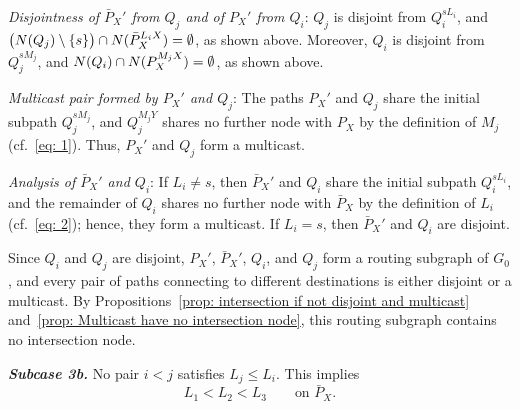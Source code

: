 \documentclass[11pt]{article}
\begin{document}
\par\vspace{0.4em}
\noindent\emph{Disjointness of \(\bar P_X'\) from \(Q_j\) and of \(P_X'\) from \(Q_i\)}:
\(Q_j\) is disjoint from \(Q_i^{sL_i}\), and \(\bigl(N(Q_j)\setminus\{s\}\bigr)\cap N(\bar P_X^{L_iX})=\nobreak\emptyset\), as shown above. Moreover, \(Q_i\) is disjoint from \(Q_j^{sM_j}\), and \(N(Q_i)\cap N(P_X^{M_jX})=\nobreak\emptyset\), as shown above.

\par\vspace{0.4em}
\noindent\emph{Multicast pair formed by \(P_X'\) and \(Q_j\)}:
The paths \(P_X'\) and \(Q_j\) share the initial subpath \(Q_j^{sM_j}\), and \(Q_j^{M_jY}\) shares no further node with \(P_X\) by the definition of \(M_j\) (cf.~\eqref{eq: 1}). Thus, \(P_X'\) and \(Q_j\) form a multicast.

\par\vspace{0.4em}
\noindent\emph{Analysis of \(\bar P_X'\) and \(Q_i\)}:
If \(L_i\neq s\), then \(\bar P_X'\) and \(Q_i\) share the initial subpath \(Q_i^{sL_i}\), and the remainder of \(Q_i\) shares no further node with \(\bar P_X\) by the definition of \(L_i\) (cf.~\eqref{eq: 2}); hence, they form a multicast. If \(L_i=s\), then \(\bar P_X'\) and \(Q_i\) are disjoint.
\par\vspace{0.6em}
\noindent Since \(Q_i\) and \(Q_j\) are disjoint, \(P_X'\), \(\bar P_X'\), \(Q_i\), and \(Q_j\) form a routing subgraph of \(G_0\), and every pair of paths connecting to different destinations is either disjoint or a multicast. By Propositions~\ref{prop: intersection if not disjoint and multicast} and~\ref{prop: Multicast have no intersection node}, this routing subgraph contains no intersection node.

\par\vspace{0.4em}
\noindent\textbf{\emph{Subcase 3b.}}
No pair \(i<j\) satisfies \(L_j\le L_i\). This implies
\[
L_1<L_2<L_3
\qquad\text{on }\bar P_X.
\]
\end{document}
